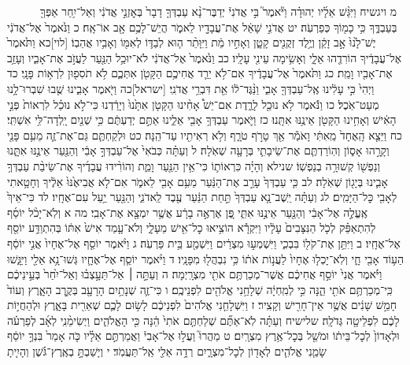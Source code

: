 \documentclass[twoside, openany, parskip=half, 11pt]{book}
\begin{document}
　　　מ ויגשיח וַיִּגַּ֨שׁ אֵלָ֜יו יְהוּדָ֗ה וַיֹּ֘אמֶר֮ בִּ֣י אֲדֹנִי֒ יְדַבֶּר־נָ֨א עַבְדְּךָ֤ דָבָר֙ בְּאׇזְנֵ֣י אֲדֹנִ֔י וְאַל־יִ֥חַר אַפְּךָ֖ בְּעַבְדֶּ֑ךָ כִּ֥י כָמ֖וֹךָ כְּפַרְעֹֽה׃ יט אֲדֹנִ֣י שָׁאַ֔ל אֶת־עֲבָדָ֖יו לֵאמֹ֑ר הֲיֵשׁ־לָכֶ֥ם אָ֖ב אוֹ־אָֽח׃ כ וַנֹּ֙אמֶר֙ אֶל־אֲדֹנִ֔י יֶשׁ־לָ֙נוּ֙ אָ֣ב זָקֵ֔ן וְיֶ֥לֶד זְקֻנִ֖ים קָטָ֑ן וְאָחִ֣יו מֵ֔ת וַיִּוָּתֵ֨ר ה֧וּא לְבַדּ֛וֹ לְאִמּ֖וֹ וְאָבִ֥יו אֲהֵבֽוֹ׃ [לוי]כא וַתֹּ֙אמֶר֙ אֶל־עֲבָדֶ֔יךָ הוֹרִדֻ֖הוּ אֵלָ֑י וְאָשִׂ֥ימָה עֵינִ֖י עָלָֽיו׃ כב וַנֹּ֙אמֶר֙ אֶל־אֲדֹנִ֔י לֹא־יוּכַ֥ל הַנַּ֖עַר לַעֲזֹ֣ב אֶת־אָבִ֑יו וְעָזַ֥ב אֶת־אָבִ֖יו וָמֵֽת׃ כג וַתֹּ֙אמֶר֙ אֶל־עֲבָדֶ֔יךָ אִם־לֹ֥א יֵרֵ֛ד אֲחִיכֶ֥ם הַקָּטֹ֖ן אִתְּכֶ֑ם לֹ֥א תֹסִפ֖וּן לִרְא֥וֹת פָּנָֽי׃ כד וַיְהִי֙ כִּ֣י עָלִ֔ינוּ אֶֽל־עַבְדְּךָ֖ אָבִ֑י וַנַּ֨גֶּד־ל֔וֹ אֵ֖ת דִּבְרֵ֥י אֲדֹנִֽי׃ [ישראל]כה וַיֹּ֖אמֶר אָבִ֑ינוּ שֻׁ֖בוּ שִׁבְרוּ־לָ֥נוּ מְעַט־אֹֽכֶל׃ כו וַנֹּ֕אמֶר לֹ֥א נוּכַ֖ל לָרֶ֑דֶת אִם־יֵשׁ֩ אָחִ֨ינוּ הַקָּטֹ֤ן אִתָּ֙נוּ֙ וְיָרַ֔דְנוּ כִּי־לֹ֣א נוּכַ֗ל לִרְאוֹת֙ פְּנֵ֣י הָאִ֔ישׁ וְאָחִ֥ינוּ הַקָּטֹ֖ן אֵינֶ֥נּוּ אִתָּֽנוּ׃ כז וַיֹּ֛אמֶר עַבְדְּךָ֥ אָבִ֖י אֵלֵ֑ינוּ אַתֶּ֣ם יְדַעְתֶּ֔ם כִּ֥י שְׁנַ֖יִם יָֽלְדָה־לִּ֥י אִשְׁתִּֽי׃ כח וַיֵּצֵ֤א הָֽאֶחָד֙ מֵֽאִתִּ֔י וָאֹמַ֕ר אַ֖ךְ טָרֹ֣ף טֹרָ֑ף וְלֹ֥א רְאִיתִ֖יו עַד־הֵֽנָּה׃ כט וּלְקַחְתֶּ֧ם גַּם־אֶת־זֶ֛ה מֵעִ֥ם פָּנַ֖י וְקָרָ֣הוּ אָס֑וֹן וְהֽוֹרַדְתֶּ֧ם אֶת־שֵׂיבָתִ֛י בְּרָעָ֖ה שְׁאֹֽלָה׃ ל וְעַתָּ֗ה כְּבֹאִי֙ אֶל־עַבְדְּךָ֣ אָבִ֔י וְהַנַּ֖עַר אֵינֶ֣נּוּ אִתָּ֑נוּ וְנַפְשׁ֖וֹ קְשׁוּרָ֥ה בְנַפְשֽׁוֹ׃ שנילא וְהָיָ֗ה כִּרְאוֹת֛וֹ כִּי־אֵ֥ין הַנַּ֖עַר וָמֵ֑ת וְהוֹרִ֨ידוּ עֲבָדֶ֜יךָ אֶת־שֵׂיבַ֨ת עַבְדְּךָ֥ אָבִ֛ינוּ בְּיָג֖וֹן שְׁאֹֽלָה׃ לב כִּ֤י עַבְדְּךָ֙ עָרַ֣ב אֶת־הַנַּ֔עַר מֵעִ֥ם אָבִ֖י לֵאמֹ֑ר אִם־לֹ֤א אֲבִיאֶ֙נּוּ֙ אֵלֶ֔יךָ וְחָטָ֥אתִי לְאָבִ֖י כׇּל־הַיָּמִֽים׃ לג וְעַתָּ֗ה יֵֽשֶׁב־נָ֤א עַבְדְּךָ֙ תַּ֣חַת הַנַּ֔עַר עֶ֖בֶד לַֽאדֹנִ֑י וְהַנַּ֖עַר יַ֥עַל עִם־אֶחָֽיו׃ לד כִּי־אֵיךְ֙ אֶֽעֱלֶ֣ה אֶל־אָבִ֔י וְהַנַּ֖עַר אֵינֶ֣נּוּ אִתִּ֑י פֶּ֚ן אֶרְאֶ֣ה בָרָ֔ע אֲשֶׁ֥ר יִמְצָ֖א אֶת־אָבִֽי׃ מה א וְלֹֽא־יָכֹ֨ל יוֹסֵ֜ף לְהִתְאַפֵּ֗ק לְכֹ֤ל הַנִּצָּבִים֙ עָלָ֔יו וַיִּקְרָ֕א הוֹצִ֥יאוּ כׇל־אִ֖ישׁ מֵעָלָ֑י וְלֹא־עָ֤מַד אִישׁ֙ אִתּ֔וֹ בְּהִתְוַדַּ֥ע יוֹסֵ֖ף אֶל־אֶחָֽיו׃ ב וַיִּתֵּ֥ן אֶת־קֹל֖וֹ בִּבְכִ֑י וַיִּשְׁמְע֣וּ מִצְרַ֔יִם וַיִּשְׁמַ֖ע בֵּ֥ית פַּרְעֹֽה׃ ג וַיֹּ֨אמֶר יוֹסֵ֤ף אֶל־אֶחָיו֙ אֲנִ֣י יוֹסֵ֔ף הַע֥וֹד אָבִ֖י חָ֑י וְלֹֽא־יָכְל֤וּ אֶחָיו֙ לַעֲנ֣וֹת אֹת֔וֹ כִּ֥י נִבְהֲל֖וּ מִפָּנָֽיו׃ ד וַיֹּ֨אמֶר יוֹסֵ֧ף אֶל־אֶחָ֛יו גְּשׁוּ־נָ֥א אֵלַ֖י וַיִּגָּ֑שׁוּ וַיֹּ֗אמֶר אֲנִי֙ יוֹסֵ֣ף אֲחִיכֶ֔ם אֲשֶׁר־מְכַרְתֶּ֥ם אֹתִ֖י מִצְרָֽיְמָה׃ ה וְעַתָּ֣ה ׀ אַל־תֵּעָ֣צְב֗וּ וְאַל־יִ֙חַר֙ בְּעֵ֣ינֵיכֶ֔ם כִּֽי־מְכַרְתֶּ֥ם אֹתִ֖י הֵ֑נָּה כִּ֣י לְמִֽחְיָ֔ה שְׁלָחַ֥נִי אֱלֹהִ֖ים לִפְנֵיכֶֽם׃ ו כִּי־זֶ֛ה שְׁנָתַ֥יִם הָרָעָ֖ב בְּקֶ֣רֶב הָאָ֑רֶץ וְעוֹד֙ חָמֵ֣שׁ שָׁנִ֔ים אֲשֶׁ֥ר אֵין־חָרִ֖ישׁ וְקָצִֽיר׃ ז וַיִּשְׁלָחֵ֤נִי אֱלֹהִים֙ לִפְנֵיכֶ֔ם לָשׂ֥וּם לָכֶ֛ם שְׁאֵרִ֖ית בָּאָ֑רֶץ וּלְהַחֲי֣וֹת לָכֶ֔ם לִפְלֵיטָ֖ה גְּדֹלָֽה׃ שלישיח וְעַתָּ֗ה לֹֽא־אַתֶּ֞ם שְׁלַחְתֶּ֤ם אֹתִי֙ הֵ֔נָּה כִּ֖י הָאֱלֹהִ֑ים וַיְשִׂימֵ֨נִֽי לְאָ֜ב לְפַרְעֹ֗ה וּלְאָדוֹן֙ לְכׇל־בֵּית֔וֹ וּמֹשֵׁ֖ל בְּכׇל־אֶ֥רֶץ מִצְרָֽיִם׃ ט מַהֲרוּ֮ וַעֲל֣וּ אֶל־אָבִי֒ וַאֲמַרְתֶּ֣ם אֵלָ֗יו כֹּ֤ה אָמַר֙ בִּנְךָ֣ יוֹסֵ֔ף שָׂמַ֧נִי אֱלֹהִ֛ים לְאָד֖וֹן לְכׇל־מִצְרָ֑יִם רְדָ֥ה אֵלַ֖י אַֽל־תַּעֲמֹֽד׃ י וְיָשַׁבְתָּ֣ בְאֶֽרֶץ־גֹּ֗שֶׁן וְהָיִ֤יתָ 
\end{document}
